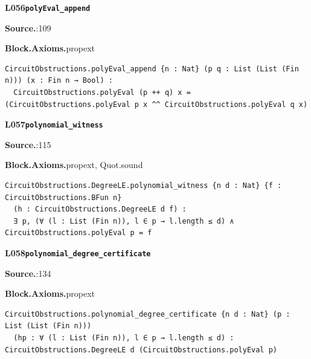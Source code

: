 \par\medskip\noindent\begin{minipage}{\textwidth}
{\small\bfseries L056\enspace\texttt{polyEval\_append}\par}
{\footnotesize\raggedright\textbf{Source.}\enspace{}:109\par
\textbf{Block.}\quad\textbf{Axioms.}\enspace propext\par}\nopagebreak
\begin{lstlisting}
CircuitObstructions.polyEval_append {n : Nat} (p q : List (List (Fin n))) (x : Fin n → Bool) :
  CircuitObstructions.polyEval (p ++ q) x = (CircuitObstructions.polyEval p x ^^ CircuitObstructions.polyEval q x)
\end{lstlisting}
\end{minipage}\par

\par\medskip\noindent\begin{minipage}{\textwidth}
{\small\bfseries L057\enspace\texttt{polynomial\_witness}\par}
{\footnotesize\raggedright\textbf{Source.}\enspace{}:115\par
\textbf{Block.}\quad\textbf{Axioms.}\enspace propext, Quot.sound\par}\nopagebreak
\begin{lstlisting}
CircuitObstructions.DegreeLE.polynomial_witness {n d : Nat} {f : CircuitObstructions.BFun n}
  (h : CircuitObstructions.DegreeLE d f) :
  ∃ p, (∀ (l : List (Fin n)), l ∈ p → l.length ≤ d) ∧ CircuitObstructions.polyEval p = f
\end{lstlisting}
\end{minipage}\par

\par\medskip\noindent\begin{minipage}{\textwidth}
{\small\bfseries L058\enspace\texttt{polynomial\_degree\_certificate}\par}
{\footnotesize\raggedright\textbf{Source.}\enspace{}:134\par
\textbf{Block.}\quad\textbf{Axioms.}\enspace propext\par}\nopagebreak
\begin{lstlisting}
CircuitObstructions.polynomial_degree_certificate {n d : Nat} (p : List (List (Fin n)))
  (hp : ∀ (l : List (Fin n)), l ∈ p → l.length ≤ d) : CircuitObstructions.DegreeLE d (CircuitObstructions.polyEval p)
\end{lstlisting}
\end{minipage}\par

